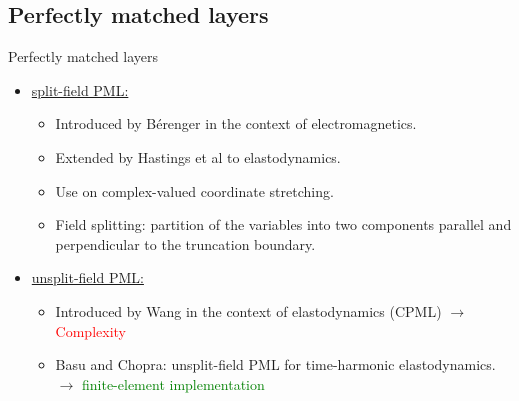 \subsection{Perfectly matched layers}
\begin{frame}{Perfectly matched layers}
\pause
    \begin{itemize}
        \item \underline{split-field PML:} 
        \begin{itemize}
        \pause
            \item Introduced by Bérenger in the context of electromagnetics.
            \item Extended by Hastings et al to elastodynamics.
            \item Use on complex-valued coordinate stretching.
            \item Field splitting: partition of the variables into two components parallel and perpendicular to the truncation boundary.
        \end{itemize}
    \item \underline{unsplit-field PML:} 
        \begin{itemize}
        \pause
            \item Introduced by Wang in the context of elastodynamics (CPML) $\rightarrow$ \textcolor{red}{Complexity} 
            \pause
            \item Basu and Chopra: unsplit-field PML for time-harmonic elastodynamics. $\rightarrow$ \textcolor{green}{finite-element implementation}
        \end{itemize}
    \end{itemize}
\end{frame}

